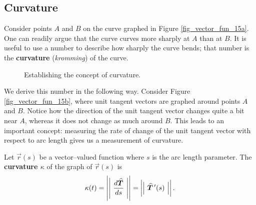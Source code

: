 \subsection{Curvature}
Consider points $A$ and $B$ on the curve graphed in Figure \ref{fig_vector_fun_15a}. One can readily argue that the curve curves more sharply at $A$ than at $B$. It is useful to use a number to describe how sharply the curve bends; that number is the \textbf{curvature} (\textit{kromming}) of the curve.

\begin{figure}[H]
\centering
\centerline{
\hspace{0.1cm}
}
\label{fig_vector_fun_15bis}
\caption{Establishing the concept of curvature.}
\end{figure}


We derive this number in the following way. Consider Figure \ref{fig_vector_fun_15b}, where  unit tangent vectors are graphed around points $A$ and $B$. Notice how the direction of the unit tangent vector changes quite a bit near $A$, whereas it does not change as much around $B$. This leads to an important concept: measuring the rate of change of the unit tangent vector with respect to arc length gives us a measurement of curvature.





\begin{definition}[Curvature]\label{def:curvature}
Let $\vec r(s)$ be a vector--valued function where $s$ is the arc length parameter. The \textbf{curvature $\kappa$} of the graph of $\vec r(s)$ is
$$\kappa(t) = \snorm{\frac{d\widehat T}{ds}} = \snorm{\widehat T\,'(s)}.$$
\end{definition}



